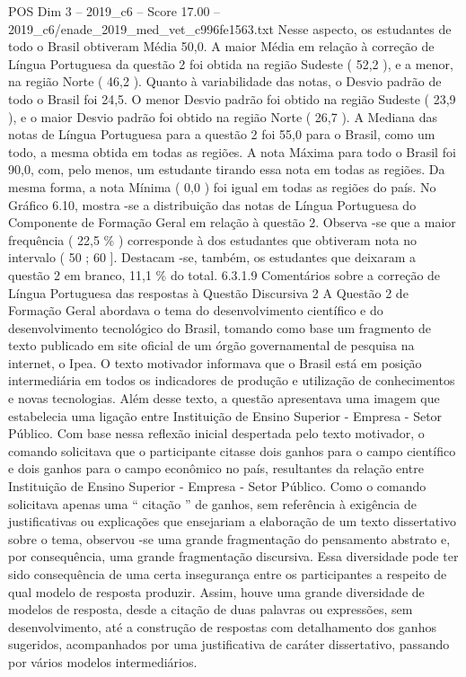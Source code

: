 \begin{textsample}{POS Dim 3 – 2019\_c6 – Score 17.00 – 2019\_c6/enade\_2019\_med\_vet\_c996fe1563.txt}
Nesse aspecto, os estudantes de todo o Brasil obtiveram Média 50,0.
A maior Média em relação à correção de Língua Portuguesa da questão 2 foi obtida na região Sudeste ( 52,2 ), e a menor, na região Norte ( 46,2 ).
Quanto à variabilidade das notas, o Desvio padrão de todo o Brasil foi 24,5.
O menor Desvio padrão foi obtido na região Sudeste ( 23,9 ), e o maior Desvio padrão foi obtido na região Norte ( 26,7 ).
A Mediana das notas de Língua Portuguesa para a questão 2 foi 55,0 para o Brasil, como um todo, a mesma obtida em todas as regiões.
A nota Máxima para todo o Brasil foi 90,0, com, pelo menos, um estudante tirando essa nota em todas as regiões.
Da mesma forma, a nota Mínima ( 0,0 ) foi igual em todas as regiões do país.
No Gráfico 6.10, mostra -se a distribuição das notas de Língua Portuguesa do Componente de Formação Geral em relação à questão 2.
Observa -se que a maior frequência ( 22,5 \% ) corresponde à dos estudantes que obtiveram nota no intervalo ( 50 ; 60 ].
Destacam -se, também, os estudantes que deixaram a questão 2 em branco, 11,1 \% do total. 6.3.1.9 Comentários sobre a correção de Língua Portuguesa das respostas à Questão Discursiva 2 A Questão 2 de Formação Geral abordava o tema do desenvolvimento científico e do desenvolvimento tecnológico do Brasil, tomando como base um fragmento de texto publicado em site oficial de um órgão governamental de pesquisa na internet, o Ipea.
O texto motivador informava que o Brasil está em posição intermediária em todos os indicadores de produção e utilização de conhecimentos e novas tecnologias.
Além desse texto, a questão apresentava uma imagem que estabelecia uma ligação entre Instituição de Ensino Superior - Empresa - Setor Público.
Com base nessa reflexão inicial despertada pelo texto motivador, o comando solicitava que o participante citasse dois ganhos para o campo científico e dois ganhos para o campo econômico no país, resultantes da relação entre Instituição de Ensino Superior - Empresa - Setor Público.
Como o comando solicitava apenas uma “ citação ” de ganhos, sem referência à exigência de justificativas ou explicações que ensejariam a elaboração de um texto dissertativo sobre o tema, observou -se uma grande fragmentação do pensamento abstrato e, por consequência, uma grande fragmentação discursiva.
Essa diversidade pode ter sido consequência de uma certa insegurança entre os participantes a respeito de qual modelo de resposta produzir.
Assim, houve uma grande diversidade de modelos de resposta, desde a citação de duas palavras ou expressões, sem desenvolvimento, até a construção de respostas com detalhamento dos ganhos sugeridos, acompanhados por uma justificativa de caráter dissertativo, passando por vários modelos intermediários.

\end{textsample}
